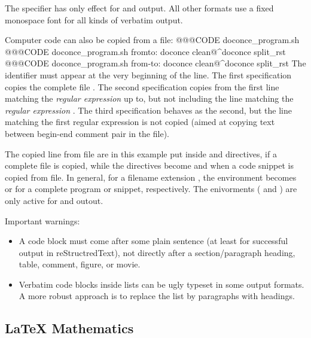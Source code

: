 \documentclass[twoside]{book}
\begin{document}
{The  specifier has only effect for  and
 output. All other formats use a fixed monospace font for all
kinds of verbatim output.

Computer code can also be copied from a file:
\bccq
 @@@CODE doconce_program.sh
 @@@CODE doconce_program.sh  fromto: doconce clean@^doconce split_rst
 @@@CODE doconce_program.sh  from-to: doconce clean@^doconce split_rst
\eccq
The  identifier must appear at the very beginning of the line.
The first specification copies the complete file .
The second specification copies from the first line matching the \emph{regular
expression}  up to, but not including the line
matching the \emph{regular expression} .
The third specification behaves as the second, but the line matching
the first regular expression is not copied (aimed at copying
text between begin-end comment pair in the file).

The copied line from file are in this example put inside 
and  directives, if a complete file is copied, while the
directives become  and  when a code snippet is copied
from file. In general, for a filename extension , the environment
becomes  or  for a complete program or snippet,
respectively. The enivorments ( and ) are only active
for  and  outout.

Important warnings:

\begin{itemize}
 \item A code block must come after some plain sentence (at least for successful
   output in reStructredText), not directly after a section/paragraph heading,
   table, comment, figure, or movie.

 \item Verbatim code blocks inside lists can be ugly typeset in some
   output formats. A more robust approach is to replace the list by
   paragraphs with headings.
\end{itemize}

\noindent

\subsection{{\LaTeX} Mathematics}

}
\end{document}
